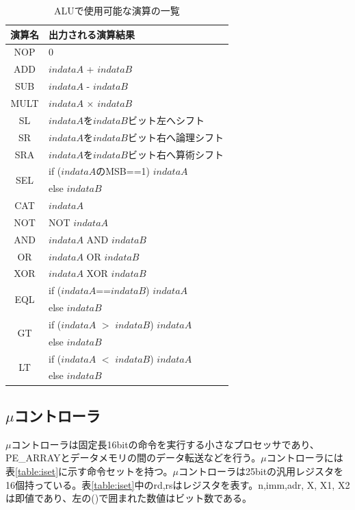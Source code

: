 {\begin{table}[h]
\centering
\caption{ALUで使用可能な演算の一覧}
\label{table:ALU}
\begin{tabular}{|c|l|} \hline
演算名 & 出力される演算結果 \\ \hline \hline
NOP & 0 \\ \hline
ADD &  $indataA$ + $indataB$\\ \hline
SUB &  $indataA$ - $indataB$\\ \hline
MULT & $indataA$ $\times$ $indataB$ \\ \hline
SL & $indataA$を$indataB$ビット左へシフト \\ \hline
SR &  $indataA$を$indataB$ビット右へ論理シフト\\ \hline
SRA & $indataA$を$indataB$ビット右へ算術シフト \\ \hline
\multirow{2}{*}{SEL} & if ($indataA$のMSB==1) $indataA$ \\
					&  else \hspace{89pt} $indataB$ \\ \hline
CAT & $indataA$ \\ \hline
NOT & NOT $indataA$ \\ \hline
AND &  $indataA$ AND $indataB$\\ \hline
OR &  $indataA$ OR $indataB$\\ \hline
XOR & $indataA$ XOR $indataB$ \\ \hline
\multirow{2}{*}{EQL} & if ($indataA$==$indataB$) $indataA$ \\
					&  else \hspace{80pt} $indataB$ \\ \hline
\multirow{2}{*}{GT} & if ($indataA$ $>$ $indataB$) $indataA$ \\
					&  else \hspace{80pt} $indataB$ \\ \hline
\multirow{2}{*}{LT} & if ($indataA$ $<$ $indataB$) $indataA$ \\
					&  else \hspace{80pt} $indataB$ \\ \hline
\end{tabular}
\end{table}

\subsection{$\mu$コントローラ}
\label{subsec:micro_controller}
$\mu$コントローラは固定長16bitの命令を実行する小さなプロセッサであり、PE\_ARRAYとデータメモリの間のデータ転送などを行う。$\mu$コントローラには表\ref{table:iset}に示す命令セットを持つ。$\mu$コントローラは25bitの汎用レジスタを16個持っている。表\ref{table:iset}中のrd,rsはレジスタを表す。n,imm,adr, X, X1, X2は即値であり、左の()で囲まれた数値はビット数である。

}
